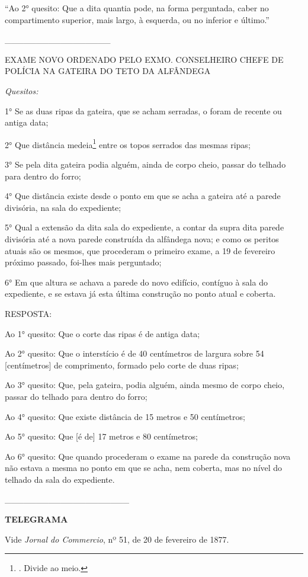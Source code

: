 ``Ao 2° quesito: Que a dita quantia pode, na forma perguntada, caber no
compartimento superior, mais largo, à esquerda, ou no inferior e
último.''

\_\_\_\_\_\_\_\_\_\_\_\_\_\_\_\_\_

EXAME NOVO ORDENADO PELO EXMO. CONSELHEIRO CHEFE DE POLÍCIA NA GATEIRA
DO TETO DA ALFÂNDEGA

\emph{Quesitos:}

1° Se as duas ripas da gateira, que se acham serradas, o foram de
recente ou antiga data;

2° Que distância medeia\footnote{. Divide ao meio.} entre os topos
serrados das mesmas ripas;

3° Se pela dita gateira podia alguém, ainda de corpo cheio, passar do
telhado para dentro do forro;

4° Que distância existe desde o ponto em que se acha a gateira até a
parede divisória, na sala do expediente;

5° Qual a extensão da dita sala do expediente, a contar da supra dita
parede divisória até a nova parede construída da alfândega nova; e como
os peritos atuais são os mesmos, que procederam o primeiro exame, a 19
de fevereiro próximo passado, foi-lhes mais perguntado;

6° Em que altura se achava a parede do novo edifício, contíguo à sala do
expediente, e se estava já esta última construção no ponto atual e
coberta.

RESPOSTA:

Ao 1° quesito: Que o corte das ripas é de antiga data;

Ao 2° quesito: Que o interstício é de 40 centímetros de largura sobre 54
{[}centímetros{]} de comprimento, formado pelo corte de duas ripas;

Ao 3° quesito: Que, pela gateira, podia alguém, ainda mesmo de corpo
cheio, passar do telhado para dentro do forro;

Ao 4° quesito: Que existe distância de 15 metros e 50 centímetros;

Ao 5° quesito: Que {[}é de{]} 17 metros e 80 centímetros;

Ao 6° quesito: Que quando procederam o exame na parede da construção
nova não estava a mesma no ponto em que se acha, nem coberta, mas no
nível do telhado da sala do expediente.

\_\_\_\_\_\_\_\_\_\_\_\_\_\_\_\_\_\_\_\_

\textbf{TELEGRAMA}

Vide \emph{Jornal do Commercio}, nº 51, de 20 de fevereiro de 1877.


